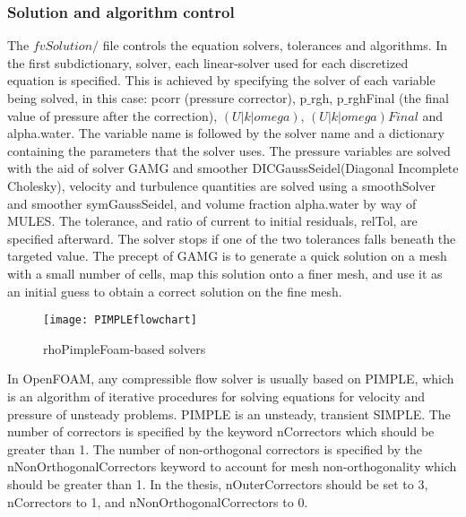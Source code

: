\subsubsection{Solution and algorithm control}
The $\textit{fvSolution/}$ file controls the equation solvers, tolerances and algorithms. 
In the first subdictionary, solver, each linear-solver used for each discretized equation is specified. This is achieved by
specifying the solver of each variable being solved, in this case: pcorr (pressure corrector), p$\_$rgh, p$\_$rghFinal
(the final value of pressure after the correction), $(U|k|omega)$, $(U|k|omega)Final$ and alpha.water. The variable name is followed by the
solver name and a dictionary containing the parameters that the solver uses. The pressure variables are solved with the aid of solver GAMG 
and smoother DICGaussSeidel(Diagonal Incomplete Cholesky), velocity and turbulence quantities are solved using a  
smoothSolver and smoother symGaussSeidel, and volume fraction alpha.water by way of MULES. The tolerance, and ratio of 
current to initial residuals, relTol, are specified afterward. The solver stops if one of the two tolerances falls 
beneath the targeted value. The precept of GAMG is to generate a quick solution on a mesh with a small number of cells, 
map this solution onto a finer mesh, and use it as an initial guess to obtain a correct solution on the fine mesh.\\
\begin{figure}[H]
    \centering
    \texttt{[image: PIMPLEflowchart]}
    \caption{rhoPimpleFoam-based solvers}
    \label{fig:fig16}
\end{figure}

In OpenFOAM, any compressible flow solver is usually based on PIMPLE, which is an algorithm of iterative procedures 
for solving equations for velocity and pressure of unsteady problems. PIMPLE is an unsteady, transient SIMPLE.
The number of correctors is specified by the keyword nCorrectors which should be greater than 1. The number of non-orthogonal correctors is specified by the 
nNonOrthogonalCorrectors keyword to account for mesh non-orthogonality which should be greater than 1. 
In the thesis, nOuterCorrectors should be set to 3, nCorrectors to 1, and nNonOrthogonalCorrectors to 0.
